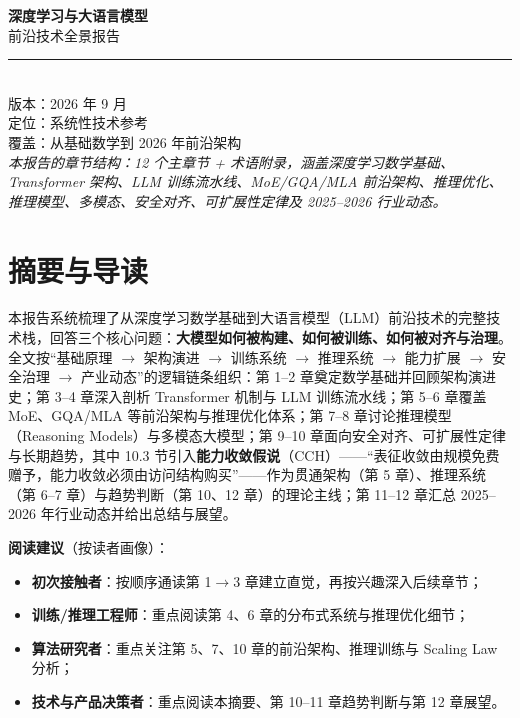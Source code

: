 \documentclass[12pt,a4paper]{article}
\begin{document}
\begin{titlepage}
\centering
\vspace*{2cm}
{\Huge\bfseries\color{cblue} 深度学习与大语言模型}\\[0.8cm]
{\Large 前沿技术全景报告}\\[1.5cm]
\rule{0.5\textwidth}{0.4pt}\\[1cm]
{\large 版本：2026 年 9 月}\\[0.3cm]
{\large 定位：系统性技术参考}\\[0.3cm]
{\large 覆盖：从基础数学到 2026 年前沿架构}\\[3cm]
{\small\itshape 本报告的章节结构：12 个主章节 + 术语附录，涵盖深度学习数学基础、Transformer 架构、LLM 训练流水线、MoE/GQA/MLA 前沿架构、推理优化、推理模型、多模态、安全对齐、可扩展性定律及 2025--2026 行业动态。}
\end{titlepage}
\tableofcontents
\newpage
\section*{摘要与导读}

本报告系统梳理了从深度学习数学基础到大语言模型（LLM）前沿技术的完整技术栈，回答三个核心问题：\textbf{大模型如何被构建、如何被训练、如何被对齐与治理}。全文按“基础原理 $\to$ 架构演进 $\to$ 训练系统 $\to$ 推理系统 $\to$ 能力扩展 $\to$ 安全治理 $\to$ 产业动态”的逻辑链条组织：第 1--2 章奠定数学基础并回顾架构演进史；第 3--4 章深入剖析 Transformer 机制与 LLM 训练流水线；第 5--6 章覆盖 MoE、GQA/MLA 等前沿架构与推理优化体系；第 7--8 章讨论推理模型（Reasoning Models）与多模态大模型；第 9--10 章面向安全对齐、可扩展性定律与长期趋势，其中 10.3 节引入\textbf{能力收敛假说}（CCH）——“表征收敛由规模免费赠予，能力收敛必须由访问结构购买”——作为贯通架构（第 5 章）、推理系统（第 6--7 章）与趋势判断（第 10、12 章）的理论主线；第 11--12 章汇总 2025--2026 年行业动态并给出总结与展望。

\textbf{阅读建议}（按读者画像）：
\begin{itemize}
  \item \textbf{初次接触者}：按顺序通读第 1$\to$3 章建立直觉，再按兴趣深入后续章节；
  \item \textbf{训练/推理工程师}：重点阅读第 4、6 章的分布式系统与推理优化细节；
  \item \textbf{算法研究者}：重点关注第 5、7、10 章的前沿架构、推理训练与 Scaling Law 分析；
  \item \textbf{技术与产品决策者}：重点阅读本摘要、第 10--11 章趋势判断与第 12 章展望。
\end{itemize}
\end{document}
